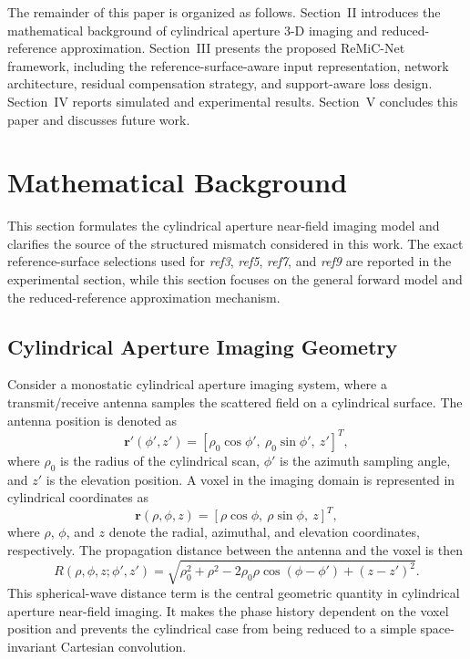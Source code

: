 \documentclass[journal]{IEEEtran}
\begin{document}
The remainder of this paper is organized as follows. Section~II introduces the mathematical background of cylindrical aperture 3-D imaging and reduced-reference approximation. Section~III presents the proposed ReMiC-Net framework, including the reference-surface-aware input representation, network architecture, residual compensation strategy, and support-aware loss design. Section~IV reports simulated and experimental results. Section~V concludes this paper and discusses future work.

\section{Mathematical Background}
\label{sec:math_background}

This section formulates the cylindrical aperture near-field imaging model and clarifies the source of the structured mismatch considered in this work. The exact reference-surface selections used for \emph{ref3}, \emph{ref5}, \emph{ref7}, and \emph{ref9} are reported in the experimental section, while this section focuses on the general forward model and the reduced-reference approximation mechanism.

\subsection{Cylindrical Aperture Imaging Geometry}
\label{subsec:geometry}

Consider a monostatic cylindrical aperture imaging system, where a transmit/receive antenna samples the scattered field on a cylindrical surface. The antenna position is denoted as
\begin{equation}
\mathbf{r}'(\phi',z')=
\left[\rho_0\cos\phi',\ \rho_0\sin\phi',\ z'\right]^T,
\label{eq:antenna_position}
\end{equation}
where \(\rho_0\) is the radius of the cylindrical scan, \(\phi'\) is the azimuth sampling angle, and \(z'\) is the elevation position. A voxel in the imaging domain is represented in cylindrical coordinates as
\begin{equation}
\mathbf{r}(\rho,\phi,z)=
\left[\rho\cos\phi,\ \rho\sin\phi,\ z\right]^T,
\label{eq:voxel_position}
\end{equation}
where \(\rho\), \(\phi\), and \(z\) denote the radial, azimuthal, and elevation coordinates, respectively. The propagation distance between the antenna and the voxel is then
\begin{equation}
R(\rho,\phi,z;\phi',z')=
\sqrt{\rho_0^2+\rho^2-2\rho_0\rho\cos(\phi-\phi')+(z-z')^2}.
\label{eq:range}
\end{equation}
This spherical-wave distance term is the central geometric quantity in cylindrical aperture near-field imaging. It makes the phase history dependent on the voxel position and prevents the cylindrical case from being reduced to a simple space-invariant Cartesian convolution.
\end{document}
